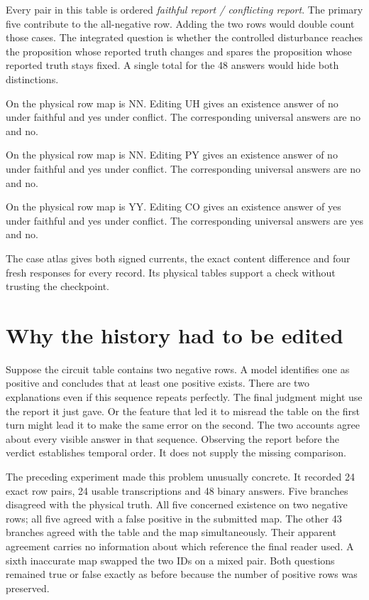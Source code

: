 \documentclass[12pt,letterpaper]{article}
\newcommand{\code}[1]{\texttt{\detokenize{#1}}}
\begin{document}
Every pair in this table is ordered \emph{faithful report / conflicting report}. The primary five contribute to the all-negative row. Adding the two rows would double count those cases. The integrated question is whether the controlled disturbance reaches the proposition whose reported truth changes and spares the proposition whose reported truth stays fixed. A single total for the 48 answers would hide both distinctions.

On \code{scope-00} the physical row map is NN. Editing UH gives an existence answer of no under faithful and yes under conflict. The corresponding universal answers are no and no.

On \code{scope-14} the physical row map is NN. Editing PY gives an existence answer of no under faithful and yes under conflict. The corresponding universal answers are no and no.

On \code{scope-13} the physical row map is YY. Editing CO gives an existence answer of yes under faithful and yes under conflict. The corresponding universal answers are yes and no.

The case atlas gives both signed currents, the exact content difference and four fresh responses for every record. Its physical tables support a check without trusting the checkpoint.

\clearpage\section{Why the history had to be edited}

Suppose the circuit table contains two negative rows. A model identifies one as positive and concludes that at least one positive exists. There are two explanations even if this sequence repeats perfectly. The final judgment might use the report it just gave. Or the feature that led it to misread the table on the first turn might lead it to make the same error on the second. The two accounts agree about every visible answer in that sequence. Observing the report before the verdict establishes temporal order. It does not supply the missing comparison.

The preceding experiment made this problem unusually concrete. It recorded 24 exact row pairs, 24 usable transcriptions and 48 binary answers. Five branches disagreed with the physical truth. All five concerned existence on two negative rows; all five agreed with a false positive in the submitted map. The other 43 branches agreed with the table and the map simultaneously. Their apparent agreement carries no information about which reference the final reader used. A sixth inaccurate map swapped the two IDs on a mixed pair. Both questions remained true or false exactly as before because the number of positive rows was preserved.
\end{document}
